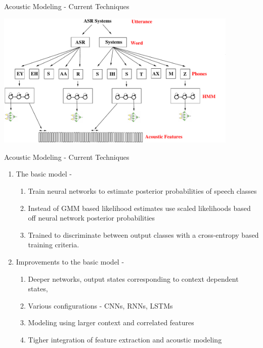 \begin{frame}{Acoustic Modeling - Current Techniques}
\begin{center}
\includegraphics[height=65mm]{figures/am-mlp}
\end{center}
\end{frame}

\begin{frame}{Acoustic Modeling - Current Techniques}
\begin{enumerate}
\item The \alert{basic} model -
\begin{enumerate}
\item Train neural networks to estimate posterior probabilities of speech classes
\item Instead of GMM based likelihood estimates use scaled likelihoods based
off neural network posterior probabilities
\item Trained to discriminate between output classes with a cross-entropy
based training criteria.
\end{enumerate}
\item \alert{Improvements to the basic model} -
\begin{enumerate}
\item Deeper networks, output states corresponding to context dependent states, 
\item Various configurations - CNNs, RNNs, LSTMs
\item Modeling using larger context and correlated features
\item Tigher integration of feature extraction and acoustic modeling
\end{enumerate}
\end{enumerate}
\end{frame}

